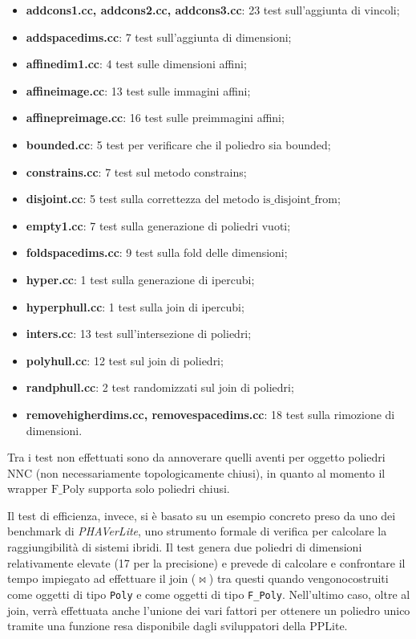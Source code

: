 \documentclass[italian]{mimosis}
\theoremstyle{definition}
\begin{document}
\begin{itemize}
\item \textbf{addcons1.cc, addcons2.cc, addcons3.cc}: 23 test sull'aggiunta di vincoli;
\item \textbf{addspacedims.cc}: 7 test sull'aggiunta di dimensioni;
\item \textbf{affinedim1.cc}: 4 test sulle dimensioni affini;
\item \textbf{affineimage.cc}: 13 test sulle immagini affini;
\item \textbf{affinepreimage.cc}: 16 test sulle preimmagini affini;
\item \textbf{bounded.cc}: 5 test per verificare che il poliedro sia bounded;
\item \textbf{constrains.cc}: 7 test sul metodo constrains;
\item \textbf{disjoint.cc}: 5 test sulla correttezza del metodo \(\text{is\_disjoint\_from}\);
\item \textbf{empty1.cc}: 7 test sulla generazione di poliedri vuoti;
\item \textbf{foldspacedims.cc}: 9 test sulla fold delle dimensioni;
\item \textbf{hyper.cc}: 1 test sulla generazione di ipercubi;
\item \textbf{hyperphull.cc}: 1 test sulla join di ipercubi;
\item \textbf{inters.cc}: 13 test sull'intersezione di poliedri;
\item \textbf{polyhull.cc}: 12 test sul join di poliedri;
\item \textbf{randphull.cc}: 2 test randomizzati sul join di poliedri;
\item \textbf{removehigherdims.cc, removespacedims.cc}: 18 test sulla rimozione di
dimensioni.
\end{itemize}

Tra i test non effettuati sono da annoverare quelli aventi per oggetto poliedri
NNC (non necessariamente topologicamente chiusi), in quanto al momento il
wrapper \(\text{F\_Poly}\) supporta solo poliedri chiusi.

Il test di efficienza, invece, si è basato su un esempio concreto preso da uno
dei benchmark di \emph{PHAVerLite}, uno strumento formale
di verifica per calcolare la raggiungibilità di sistemi ibridi.
Il test genera due poliedri di dimensioni relativamente elevate
(17 per la precisione) e prevede di calcolare e confrontare il tempo impiegato ad effettuare
il join (\(\bowtie\)) tra questi quando vengonocostruiti come oggetti di tipo \texttt{Poly} e
come oggetti di tipo \texttt{F\_Poly}. Nell'ultimo caso, oltre al join, verrà effettuata
anche l'unione dei vari fattori per ottenere un poliedro unico tramite una
funzione resa disponibile dagli sviluppatori della PPLite.
\end{document}
